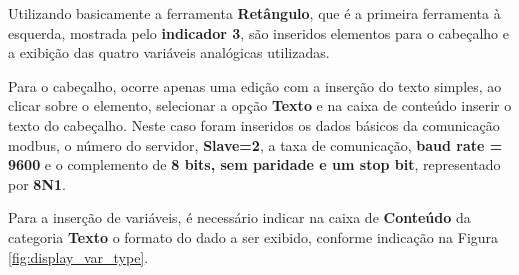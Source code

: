 \begin{figure}[ht!]
	\centering
\end{figure}


Utilizando basicamente a ferramenta \textbf{Retângulo}, 
que é a primeira ferramenta à esquerda, mostrada pelo \textbf{indicador 3}, são inseridos elementos para o cabeçalho e a exibição das quatro variáveis analógicas utilizadas. 
 
Para o cabeçalho, 
ocorre apenas uma edição com a inserção do texto simples, 
ao clicar sobre o elemento, 
selecionar a opção \textbf{Texto} e na caixa de conteúdo inserir o texto do cabeçalho.
Neste caso foram inseridos os dados básicos da comunicação modbus, 
o número do servidor, \textbf{Slave=2}, 
a taxa de comunicação, \textbf{baud rate = 9600} e o complemento de \textbf{8 bits, sem paridade e um stop bit}, 
representado por \textbf{8N1}.

Para a inserção de variáveis, 
é necessário indicar na caixa de \textbf{Conteúdo} da categoria \textbf{Texto} o formato do dado a ser exibido, 
conforme indicação na Figura \ref{fig:display_var_type}.


\begin{figure}[ht!]
	\centering
\end{figure}

